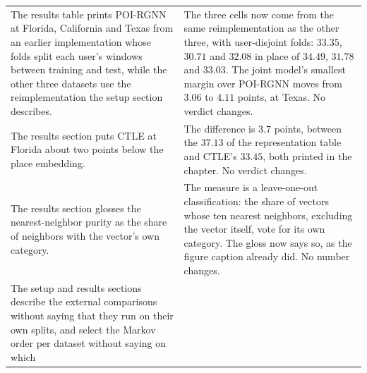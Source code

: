 \begin{table}[htb]
\begin{tabular}{@{}p{}p{}@{}}
\addlinespace
The results table prints POI-RGNN at Florida, California and
Texas from an earlier implementation whose folds split each
user's windows between training and test, while the other three
datasets use the reimplementation the setup section describes. &
The three cells now come from the same reimplementation as the
other three, with user-disjoint folds: $33.35$, $30.71$ and
$32.08$ in place of $34.49$, $31.78$ and $33.03$. The joint
model's smallest margin over POI-RGNN moves from $3.06$ to
$4.11$ points, at Texas. No verdict changes. \\
\addlinespace
The results section puts CTLE at Florida about two points below
the place embedding. &
The difference is $3.7$ points, between the $37.13$ of the
representation table and CTLE's $33.45$, both printed in the
chapter. No verdict changes. \\
\addlinespace
The results section glosses the nearest-neighbor purity as the
share of neighbors with the vector's own category. &
The measure is a leave-one-out classification: the share of
vectors whose ten nearest neighbors, excluding the vector
itself, vote for its own category. The gloss now says so, as the
figure caption already did. No number changes. \\
\addlinespace
The setup and results sections describe the external
comparisons without saying that they run on their own splits,
and select the Markov order per dataset without saying on which

\end{tabular}
\end{table}
